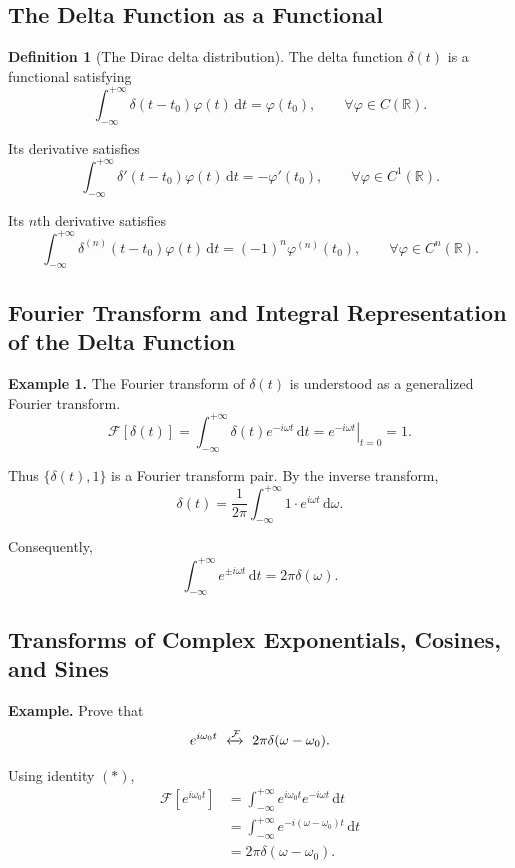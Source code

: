 \documentclass[11pt,a4paper]{article}
\theoremstyle{definition}
\newtheorem{definition}{Definition}
\theoremstyle{plain}
\begin{document}
\subsection{The Delta Function as a Functional}

\begin{definition}[The Dirac delta distribution]

The delta function \(\delta(t)\) is a functional satisfying
\[
\int_{-\infty}^{+\infty}
\delta(t-t_0)\varphi(t)\,\mathrm dt
=\varphi(t_0),
\qquad \forall\varphi\in C(\mathbb R).
\]

\end{definition}

Its derivative satisfies
\[
\int_{-\infty}^{+\infty}
\delta'(t-t_0)\varphi(t)\,\mathrm dt
=-\varphi'(t_0),
\qquad \forall\varphi\in C^1(\mathbb R).
\]

Its \(n\)th derivative satisfies
\[
\int_{-\infty}^{+\infty}
\delta^{(n)}(t-t_0)\varphi(t)\,\mathrm dt
=(-1)^n\varphi^{(n)}(t_0),
\qquad \forall\varphi\in C^n(\mathbb R).
\]

\subsection{Fourier Transform and Integral Representation of the Delta Function}

\textbf{Example 1.} The Fourier transform of \(\delta(t)\) is understood
as a generalized Fourier transform.
\[
\mathcal F[\delta(t)]
=\int_{-\infty}^{+\infty}\delta(t)e^{-i\omega t}\,\mathrm dt
=\left.e^{-i\omega t}\right|_{t=0}
=1.
\]

Thus \(\{\delta(t),1\}\) is a Fourier transform pair. By the inverse
transform,
\[
\delta(t)=\frac1{2\pi}
\int_{-\infty}^{+\infty}1\cdot e^{i\omega t}\,\mathrm d\omega.
\]

Consequently,
\[
\int_{-\infty}^{+\infty}e^{\pm i\omega t}\,\mathrm dt
=2\pi\delta(\omega).
\tag{*}
\]

\subsection{Transforms of Complex Exponentials, Cosines, and Sines}

\textbf{Example.} Prove that
\[
e^{i\omega_0t}
\ \xleftrightarrow{\mathcal F}\
2\pi\delta(\omega-\omega_0).
\]

Using identity \((*)\),
\[
\begin{aligned}
\mathcal F[e^{i\omega_0t}]
&=\int_{-\infty}^{+\infty}
e^{i\omega_0t}e^{-i\omega t}\,\mathrm dt\\
&=\int_{-\infty}^{+\infty}
e^{-i(\omega-\omega_0)t}\,\mathrm dt\\
&=2\pi\delta(\omega-\omega_0).
\end{aligned}
\]
\end{document}
